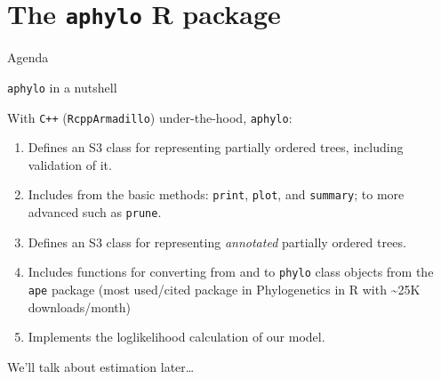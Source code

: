 \documentclass[9pt,handout,ignorenonframetext,]{beamer}
\begin{document}
\section{\texorpdfstring{The \texttt{aphylo} R
package}{The aphylo R package}}\label{the-aphylo-r-package}

\begin{frame}[t]{Agenda}

\tableofcontents[currentsection]

\end{frame}

\begin{frame}[fragile]{\texttt{aphylo} in a nutshell}

With \texttt{C++} (\texttt{RcppArmadillo}) under-the-hood,
\texttt{aphylo}:

\begin{enumerate}
\def\labelenumi{\arabic{enumi}.}
\item
  Defines an S3 class for representing partially ordered trees,
  including validation of it.
\item
  Includes from the basic methods: \texttt{print}, \texttt{plot}, and
  \texttt{summary}; to more advanced such as \texttt{prune}.
\item
  Defines an S3 class for representing \emph{annotated} partially
  ordered trees.
\item
  Includes functions for converting from and to \texttt{phylo} class
  objects from the \texttt{ape} package (most used/cited package in
  Phylogenetics in R with \textasciitilde{}25K downloads/month)
\item
  Implements the loglikelihood calculation of our model.
\end{enumerate}

We'll talk about estimation later\ldots{}

\end{frame}
\end{document}
